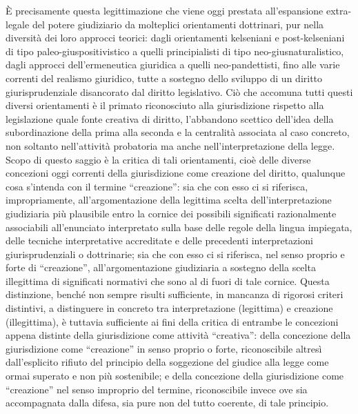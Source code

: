 È precisamente questa legittimazione che viene oggi prestata all’espansione extra-legale del potere giudiziario da molteplici orientamenti dottrinari, pur nella diversità dei loro approcci teorici: dagli orientamenti kelseniani e post-kelseniani di tipo paleo-giuspositivistico a quelli principialisti di tipo neo-giusnaturalistico, dagli approcci dell’ermeneutica giuridica a quelli neo-pandettisti, fino alle varie correnti del realismo giuridico, tutte a sostegno dello sviluppo di un diritto giurisprudenziale disancorato dal diritto legislativo. Ciò che accomuna tutti questi diversi orientamenti è il primato riconosciuto alla giurisdizione rispetto alla legislazione quale fonte creativa di diritto, l’abbandono scettico dell’idea della subordinazione della prima alla seconda e la centralità associata al caso concreto, non soltanto nell’attività probatoria ma anche nell’interpretazione della legge.
Scopo di questo saggio è la critica di tali orientamenti, cioè delle diverse concezioni oggi correnti della giurisdizione come creazione del diritto, qualunque cosa s’intenda con il termine “creazione”: sia che con esso ci si riferisca, impropriamente, all’argomentazione della legittima scelta dell’interpretazione giudiziaria più plausibile entro la cornice dei possibili significati razionalmente associabili all’enunciato interpretato sulla base delle regole della lingua impiegata, delle tecniche interpretative accreditate e delle precedenti interpretazioni giurisprudenziali o dottrinarie; sia che con esso ci si riferisca, nel senso proprio e forte di “creazione”, all’argomentazione giudiziaria a sostegno della scelta illegittima di significati normativi che sono al di fuori di tale cornice. Questa distinzione, benché non sempre risulti sufficiente, in mancanza di rigorosi criteri distintivi, a distinguere in concreto tra interpretazione (legittima) e creazione (illegittima), è tuttavia sufficiente ai fini della critica di entrambe le concezioni appena distinte della giurisdizione come attività “creativa”: della concezione della giurisdizione come “creazione” in senso proprio o forte, riconoscibile altresì dall’esplicito rifiuto del principio della soggezione del giudice alla legge come ormai superato e non più sostenibile; e della concezione della giurisdizione come “creazione” nel senso improprio del termine, riconoscibile invece ove sia accompagnata dalla difesa, sia pure non del tutto coerente, di tale principio.
